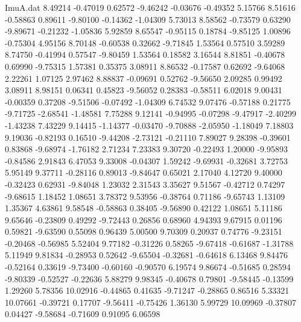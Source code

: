 \begin{filecontents}{ImuA.dat}
   8.49214   -0.47019    0.62572   -9.46242   -0.03676   -0.49352    5.15766
   8.51616   -0.58863    0.89611   -9.80100   -0.14362   -1.04309    5.73013
   8.58562   -0.73579    0.63290   -9.89671   -0.21232   -1.05836    5.92859
   8.65547   -0.95115    0.18784   -9.85125    1.00896   -0.75304    4.95156
   8.70148   -0.60538    0.32662   -9.71845    1.53564    0.57510    3.59289
   8.74750   -0.41994    0.57547   -9.80459    1.53564    0.18582    3.16544
   8.81851   -0.40678    0.69990   -9.75315    1.57381    0.35375    3.08911
   8.86532   -0.17587    0.62692   -9.64068    2.22261    1.07125    2.97462
   8.88837   -0.09691    0.52762   -9.56650    2.09285    0.99492    3.08911
   8.98151    0.06341    0.45823   -9.56052    0.28383   -0.58511    6.02018
   9.00431   -0.00359    0.37208   -9.51506   -0.07492   -1.04309    6.74532
   9.07476   -0.57188    0.21775   -9.71725   -2.68541   -1.48581    7.75288
   9.12141   -0.94995   -0.07298   -9.47917   -2.40299   -1.43238    7.43229
   9.14415   -1.14377   -0.03470   -9.70888   -2.05950   -1.18049    7.18803
   9.19036   -0.82193    0.16510   -9.44208   -2.73121   -0.21110    7.89027
   9.28398   -0.39601    0.83868   -9.68974   -1.76182    2.71234    7.23383
   9.30720   -0.22493    1.20000   -9.95893   -0.84586    2.91843    6.47053
   9.33008   -0.04307    1.59242   -9.69931   -0.32681    3.72753    5.95149
   9.37711   -0.28116    0.89013   -9.84647    0.65021    2.17040    4.12720
   9.40000   -0.32423    0.62931   -9.84048    1.23032    2.31543    3.35627
   9.51567   -0.42712    0.74297   -9.68615    1.18452    1.08651    3.78372
   9.53956   -0.38764    0.71186   -9.65743    1.13109    1.35367    4.63861
   9.58548   -0.58863    0.38405   -9.56890    0.42122    1.08651    5.11186
   9.65646   -0.23809    0.49292   -9.72443    0.26856    0.68960    4.94393
   9.67915    0.01196    0.59821   -9.63590    0.55098    0.96439    5.00500
   9.70309    0.20937    0.74776   -9.23151   -0.20468   -0.56985    5.52404
   9.77182   -0.31226    0.58265   -9.67418   -0.61687   -1.31788    5.11949
   9.81834   -0.28953    0.52642   -9.65504   -0.32681   -0.64618    6.13468
   9.84476   -0.52164    0.33619   -9.73400   -0.60160   -0.90570    6.19574
   9.86674   -0.51685    0.28594   -9.80339   -0.52527   -0.22636    5.88279
   9.98345   -0.40678    0.79801   -9.58445   -0.13599    1.29260    5.78356
  10.02916   -0.44865    0.41635   -9.71247   -0.28865    0.86516    5.33321
  10.07661   -0.39721    0.17707   -9.56411   -0.75426    1.36130    5.99729
  10.09969   -0.37807    0.04427   -9.58684   -0.71609    0.91095    6.06598

\end{filecontents}
